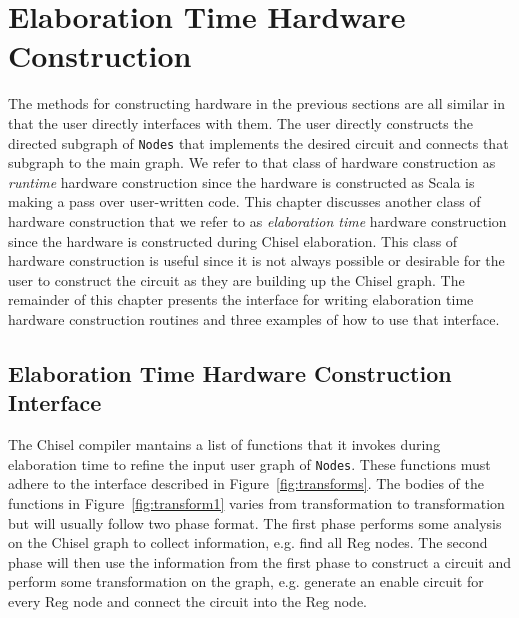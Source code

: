 \section{Elaboration Time Hardware Construction}
The methods for constructing hardware in the previous sections are all
similar in that the user directly interfaces with them. The user
directly constructs the directed subgraph of {\tt Nodes} that
implements the desired circuit and connects that subgraph to the main
graph. We refer to that class of hardware construction as 
{\it runtime} hardware construction since the hardware is
constructed as Scala is making a pass over user-written code. This
chapter discusses another class of hardware construction that we refer
to as {\it elaboration time} hardware construction since the
hardware is constructed during Chisel elaboration. This class of
hardware construction is useful since it is not always possible or
desirable for the user to construct the circuit as they are building
up the Chisel graph. The remainder of this chapter presents the
interface for writing elaboration time hardware construction routines
and three examples of how to use that interface.

\subsection{Elaboration Time Hardware Construction Interface}
The Chisel compiler mantains a list of functions that it invokes
during elaboration time to refine the input user graph of 
{\tt Nodes}. These functions must adhere to the interface described in
Figure~\ref{fig:transforms}. The bodies of the functions in
Figure~\ref{fig:transform1} varies from transformation to
transformation but will usually follow two phase format. The first
phase performs some analysis on the Chisel graph to collect
information, e.g. find all Reg nodes. The second phase will then use
the information from the first phase to construct a circuit and
perform some transformation on the graph, e.g. generate an enable
circuit for every Reg node and connect the circuit into the Reg node.

